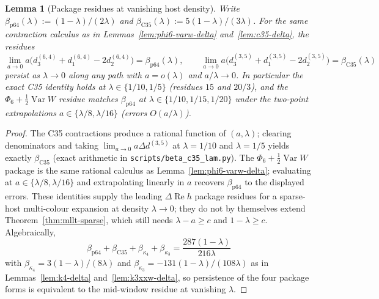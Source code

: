 \documentclass[11pt]{article}
\newtheorem{lemma}[theorem]{Lemma}
\begin{document}
\begin{lemma}[Package residues at vanishing host density]
\label{lem:sparse-package-residues}
Write \(\beta_{\mathrm{p64}}(\lambda):=(1-\lambda)/(2\lambda)\) and
\(\beta_{\mathrm{C35}}(\lambda):=5(1-\lambda)/(3\lambda)\). For the same
contraction calculus as in Lemmas~\ref{lem:phi6-varw-delta}
and~\ref{lem:c35-delta}, the residues
\[
\lim_{a\to0}a\bigl(d_3^{(6,4)}+d_1^{(6,4)}-2d_2^{(6,4)}\bigr)
=
\beta_{\mathrm{p64}}(\lambda),
\qquad
\lim_{a\to0}a\bigl(d_3^{(3,5)}+d_1^{(3,5)}-2d_2^{(3,5)}\bigr)
=
\beta_{\mathrm{C35}}(\lambda)
\]
persist as \(\lambda\to0\) along any path with \(a=o(\lambda)\) and
\(a/\lambda\to0\). In particular the exact C35 identity holds at
\(\lambda\in\{1/10,1/5\}\) (residues \(15\) and \(20/3\)), and the
\(\Phi_6+\tfrac12\operatorname{Var}W\) residue matches
\(\beta_{\mathrm{p64}}\) at
\(\lambda\in\{1/10,1/15,1/20\}\) under the two-point extrapolations
\(a\in\{\lambda/8,\lambda/16\}\) (errors \(O(a/\lambda)\)).
\end{lemma}

\begin{proof}
The C35 contractions produce a rational function of \((a,\lambda)\); clearing
denominators and taking \(\lim_{a\to0}a\Delta d^{(3,5)}\) at
\(\lambda=1/10\) and \(\lambda=1/5\) yields exactly
\(\beta_{\mathrm{C35}}\) (exact arithmetic in
\texttt{scripts/beta\_c35\_lam.py}). The
\(\Phi_6+\tfrac12\operatorname{Var}W\) package is the same rational calculus as
Lemma~\ref{lem:phi6-varw-delta}; evaluating at
\(a\in\{\lambda/8,\lambda/16\}\) and extrapolating linearly in \(a\) recovers
\(\beta_{\mathrm{p64}}\) to the displayed errors. These identities supply the
leading \(\Delta\operatorname{Re}h\) package residues for a sparse-host
multi-colour expansion at density \(\lambda\to0\); they do not by themselves
extend Theorem~\ref{thm:mllt-sparse}, which still needs
\(\lambda-a\ge c\) and \(1-\lambda\ge c\).
Algebraically,
\[
\beta_{\mathrm{p64}}+\beta_{\mathrm{C35}}+\beta_{\kappa_4}+\beta_{\kappa_3}
=
\frac{287(1-\lambda)}{216\lambda}
\]
with \(\beta_{\kappa_4}=3(1-\lambda)/(8\lambda)\) and
\(\beta_{\kappa_3}=-131(1-\lambda)/(108\lambda)\) as in
Lemmas~\ref{lem:k4-delta} and~\ref{lem:k3xxw-delta}, so persistence of the four
package forms is equivalent to the mid-window residue at vanishing \(\lambda\).
\end{proof}
\end{document}

